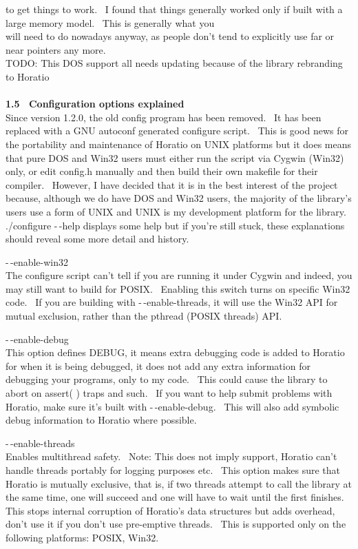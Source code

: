 \documentclass{article}
\begin{document}
to get things to work.~ I found that things generally worked only
if built with a large memory model.~ This is generally what you\\
will need to do nowadays anyway, as people don't tend to explicitly use
far or near pointers any more.\\
TODO: This DOS support all needs updating because of the library rebranding to Horatio\\
\\
\textbf{1.5~ Configuration options explained}
\\
Since version 1.2.0, the old config program has been removed.~ It
has been replaced with a GNU autoconf generated configure script.~
This is good news for the portability and maintenance of Horatio on
UNIX platforms but it does means that pure DOS and Win32 users must
either run the script via Cygwin (Win32) only, or edit config.h
manually and then build their own makefile for their compiler.~
However, I have decided that it is in the best interest of the project
because, although we do have DOS and Win32 users, the majority of the
library's users use a form of UNIX and UNIX is my development platform
for the library.\\
./configure -$\,$-help displays some help but if you're still stuck, these
explanations
should reveal some more detail and history.
\par -$\,$-enable-win32\\
The configure script can't tell if you are running it under Cygwin and
indeed, you may still want to build for POSIX.~ Enabling this
switch turns on specific Win32 code.~ If you are building with
-$\,$-enable-threads, it will use the Win32 API for mutual exclusion,
rather than the pthread (POSIX threads) API.\\

\par -$\,$-enable-debug
\\
This option defines DEBUG, it means extra debugging code is added to
Horatio for when it is being debugged, it does not add any extra
information
for debugging your programs, only to my code.~ This could cause
the
library to abort on assert( ) traps and such.~ If you want to help
submit problems with Horatio, make sure it's built with
-$\,$-enable-debug.~
This will also add symbolic debug information to Horatio where
possible.\\

\par -$\,$-enable-threads
\\
Enables multithread safety.~ Note: This does not imply support,
Horatio can't handle threads portably for logging purposes etc.~
This option makes sure that Horatio is mutually exclusive, that is, if
two threads attempt to call the library at the same time, one will
succeed
and one will have to wait until the first finishes.~ This stops
internal
corruption of Horatio's data structures but adds overhead, don't use
it
if you don't use pre-emptive threads.~ This is supported only on
the
following platforms: POSIX, Win32.\\
\end{document}
